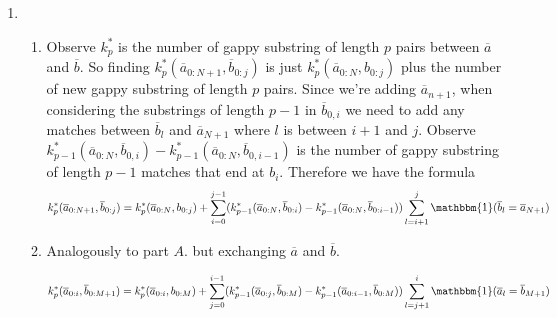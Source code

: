 \documentclass[10pt]{article}
\theoremstyle{definition}
\theoremstyle{remark}
\def\1{\mathbbm{1}}
\newcommand{\ol}[1]{\overline{#1}}
\begin{document}
\begin{enumerate}
\begin{enumerate}
\begin{enumerate}
\begin{center}
\begin{minipage}{.9\textwidth}
\begin{algorithm}[H]
                \end{algorithm}
                \end{minipage}
                \end{center}


            \item \begin{enumerate}
                \item Observe $k_p^*$ is the number of gappy substring of length $p$
                pairs between $\ol a$ and $\ol b$. So finding
                $k_p^*(\ol a_{0:N+1},\ol b_{0:j})$ is just
                $k_p^*(\ol a_{0:N},b_{0:j})$ plus the number of new gappy
                substring of length $p$ pairs. Since we're adding $\ol a_{n+1}$,
                when considering the substrings of length $p-1$ in $\ol b_{0,i}$
                we need to add any matches between $\ol b_{l}$ and $\ol a_{N+1}$
                where $l$ is between $i+1$ and $j$. Observe
                $k_{p-1}^*(\ol a_{0:N},\ol b_{0,i}) -
                 k_{p-1}^*(\ol a_{0:N},\ol b_{0,i-1})$ is the number of gappy
                 substring of length $p-1$ matches that end at $b_i$.
                 Therefore we have the formula
                $$
                    k_p^*(\ol a_{0:N+1},\ol b_{0:j}) =
                    k_p^*(\ol a_{0:N},b_{0:j}) +
                    \sum_{i=0}^{j-1}
                    (k_{p-1}^*(\ol a_{0:N},\ol b_{0:i})
                    -k_{p-1}^*(\ol a_{0:N},\ol b_{0:i-1}))
                    \sum_{l = i+1}^{j}
                    \1(
                        \ol b_{l} = \ol a_{N+1}
                    )
                $$

                \item Analogously to part $A.$ but exchanging $\ol a$ and $\ol b$.


                $$
                    k_p^*(\ol a_{0:i},\ol b_{0:M+1}) =
                    k_p^*(\ol a_{0:i},b_{0:M}) +
                    \sum_{j=0}^{i-1}
                    (k_{p-1}^*(\ol a_{0:j},\ol b_{0:M})
                    -k_{p-1}^*(\ol a_{0:i-1},\ol b_{0:M}))
                    \sum_{l = j+1}^{i}
                    \1(
                        \ol a_{l} = \ol b_{M+1}
                    )
                $$



\end{enumerate}
\end{enumerate}
\end{enumerate}
\end{enumerate}
\end{document}
